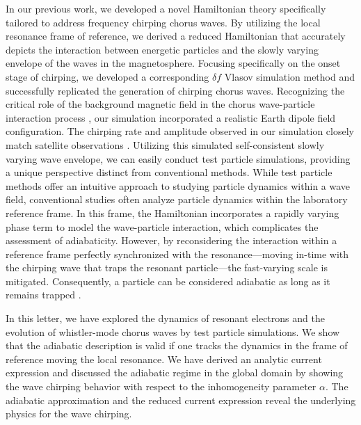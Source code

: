 In our previous work, we developed a novel Hamiltonian theory \cite{zheng2024} specifically tailored to address frequency chirping chorus waves.
By utilizing the local resonance frame of reference, we derived a reduced Hamiltonian that accurately depicts the interaction between energetic particles and the slowly varying envelope of the waves in the magnetosphere.
Focusing specifically on the onset stage of chirping, we developed a corresponding  $\delta f$ Vlasov simulation method and successfully replicated the generation of chirping chorus waves.
Recognizing the critical role of the background magnetic field in the chorus wave-particle interaction process \cite{wu2023,wu_controlling_2020}, our simulation incorporated a realistic Earth dipole field configuration.
The chirping rate and amplitude observed in our simulation closely match satellite observations \cite{cully_observational_2011}. 
Utilizing this simulated self-consistent slowly varying wave envelope, we can easily conduct test particle simulations, providing a unique perspective distinct from conventional methods.
While test particle methods \cite{huanghua_test_ptc,omura_test_ptc,tao_test_ptc} offer an intuitive approach to studying particle dynamics within a wave field, conventional studies often analyze particle dynamics within the laboratory reference frame. In this frame, the Hamiltonian incorporates  a rapidly varying phase term to model the wave-particle interaction, which complicates the assessment of adiabaticity. However, by reconsidering the interaction within a reference frame perfectly synchronized with the resonance—moving in-time with the chirping wave that traps the resonant particle—the fast-varying scale is mitigated. Consequently, a particle can be considered adiabatic as long as it remains trapped  \cite{CARY1989287}.

In this letter, we have explored the dynamics of resonant electrons and the evolution of whistler-mode chorus waves by test particle simulations.
We show that the adiabatic description is valid if one tracks the dynamics in the frame of reference moving the local resonance.
We have derived an analytic current expression and discussed the adiabatic regime in the global domain by showing the wave chirping behavior with respect to the inhomogeneity parameter $\alpha$.
The adiabatic approximation and the reduced current expression reveal the underlying physics for the wave chirping.


